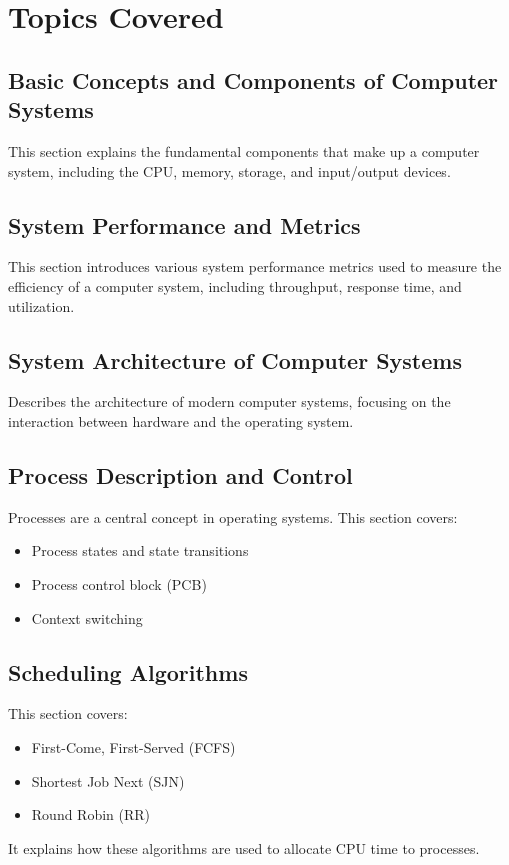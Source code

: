 \documentclass[12pt]{article}
\begin{document}
\section{Topics Covered}

\subsection{Basic Concepts and Components of Computer Systems}
This section explains the fundamental components that make up a computer system, including the CPU, memory, storage, and input/output devices.

\subsection{System Performance and Metrics}
This section introduces various system performance metrics used to measure the efficiency of a computer system, including throughput, response time, and utilization.

\subsection{System Architecture of Computer Systems}
Describes the architecture of modern computer systems, focusing on the interaction between hardware and the operating system.

\subsection{Process Description and Control}
Processes are a central concept in operating systems. This section covers:
\begin{itemize}
    \item Process states and state transitions
    \item Process control block (PCB)
    \item Context switching
\end{itemize}

\subsection{Scheduling Algorithms}
This section covers:
\begin{itemize}
    \item First-Come, First-Served (FCFS)
    \item Shortest Job Next (SJN)
    \item Round Robin (RR)
\end{itemize}
It explains how these algorithms are used to allocate CPU time to processes.
\end{document}
